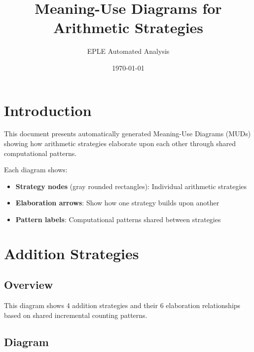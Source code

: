 \documentclass{article}
\title{Meaning-Use Diagrams for Arithmetic Strategies}
\author{EPLE Automated Analysis}
\date{\today}
\begin{document}
\maketitle

\tableofcontents

\section{Introduction}

This document presents automatically generated Meaning-Use Diagrams (MUDs) showing how arithmetic strategies elaborate upon each other through shared computational patterns.

Each diagram shows:
\begin{itemize}
    \item \textbf{Strategy nodes} (gray rounded rectangles): Individual arithmetic strategies
    \item \textbf{Elaboration arrows}: Show how one strategy builds upon another
    \item \textbf{Pattern labels}: Computational patterns shared between strategies
\end{itemize}

\newpage

\section{Addition Strategies}

\subsection{Overview}
This diagram shows 4 addition strategies and their 6 elaboration relationships based on shared incremental counting patterns.

\subsection{Diagram}
\end{document}
